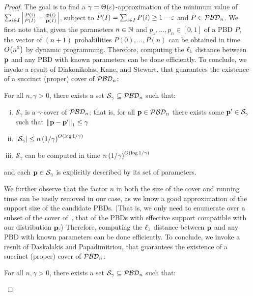 \begin{proof}
The goal is to find a $\gamma = \Theta(\eps)$-approximation of the minimum value of $\sum_{i\in I}\abs{\frac{P(i)}{P(I)} - \frac{\D(i)}{\D(I)}}$, subject to $P(I)=\sum_{i\in I} P(i) \geq 1-\eps$ and $P\in\classpbd[n]$. We first note that, given the parameters $n \in \N$ and $p_1,\dots,p_n\in[0,1]$ of a PBD $P$, the vector of $(n+1)$ probabilities $P(0),\dots,P(n)$ can be obtained in time $\bigO{n^2}$ by dynamic programming. 
Therefore, computing the $\lp[1]$ distance between $\D$ and any PBD with known parameters can be done efficiently. To conclude, we invoke a result of Diakonikolas, Kane, and Stewart, that guarantees the existence of a succinct (proper) cover of $\classpbd[n]$:
\begin{theorem}
  For all $n, \gamma >0$, there exists a set $\mathcal{S}_{\gamma} \subseteq \classpbd[n]$ such that:
  \begin{enumerate}[(i)]
  \item $\mathcal{S}_{\gamma}$ is a $\gamma$-cover of $\classpbd[n]$; that is, for all $\D \in \classpbd[n]$ there exists some $\D^\prime \in \mathcal{S}_{\gamma}$ such that $\normone{\D-\D^\prime} \leq \gamma$
  \item {$\abs{\mathcal{S}_{\gamma}} \leq n \left({1/\gamma}\right)^{\bigO{ \log{1/\gamma}}}$}
  \item $\mathcal{S}_{\gamma}$ can be computed in time {$n\left( {1/\gamma} \right)^{\bigO{\log{1/\gamma}}}$}
  \end{enumerate}
and each $\D\in\mathcal{S}_{\gamma}$  is explicitly described by its set of parameters.
\end{theorem}
\noindent We further observe that the factor $n$ in both the size of the cover and running time can be easily removed in our case, as we know a good approximation of the support size of the candidate PBDs. (That is, we only need to enumerate over a subset of the cover of~\cite{DKS:15}, that of the PBDs with effective support compatible with our distribution $\D$.)
\iffalse
Therefore, computing the $\lp[1]$ distance between $\D$ and any PBD with known parameters can be done efficiently. To conclude, we invoke a result of Daskalakis and Papadimitriou, that guarantees the existence of a succinct (proper) cover of $\classpbd[n]$:
\begin{theorem}[{\cite[Theorem 1]{DP:13}}]
  For all $n, \gamma >0$, there exists a set $\mathcal{S}_{\gamma} \subseteq \classpbd[n]$ such that:
  \begin{enumerate}[(i)]

\end{enumerate}
\end{theorem}
\end{proof}
